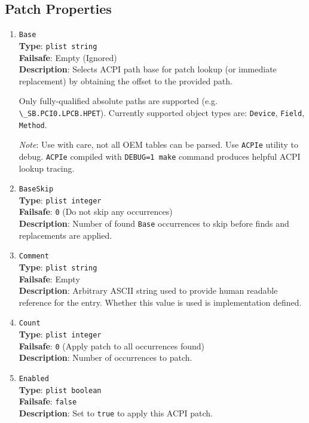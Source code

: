 \documentclass[]{article}
\makeatletter
\renewcommand{\label}[1]{%
\zref@wrapper@immediate{\oldlabel{#1}}}  %
\makeatother
\begin{document}
\subsection{Patch Properties}\label{acpipropspatch}

\begin{enumerate}

\item
  \texttt{Base}\\
  \textbf{Type}: \texttt{plist\ string}\\
  \textbf{Failsafe}: Empty (Ignored)\\
  \textbf{Description}: Selects ACPI path base for patch lookup (or immediate
  replacement) by obtaining the offset to the provided path.

  Only fully-qualified absolute paths are supported (e.g. \texttt{\textbackslash \_SB.PCI0.LPCB.HPET}).
  Currently supported object types are: \texttt{Device}, \texttt{Field}, \texttt{Method}.

  \emph{Note}: Use with care, not all OEM tables can be parsed. Use \texttt{ACPIe}
  utility to debug. \texttt{ACPIe} compiled  with \texttt{DEBUG=1 make} command
  produces helpful ACPI lookup tracing.

\item
  \texttt{BaseSkip}\\
  \textbf{Type}: \texttt{plist\ integer}\\
  \textbf{Failsafe}: \texttt{0} (Do not skip any occurrences)\\
  \textbf{Description}: Number of found \texttt{Base} occurrences to skip before
  finds and replacements are applied.

\item
  \texttt{Comment}\\
  \textbf{Type}: \texttt{plist\ string}\\
  \textbf{Failsafe}: Empty\\
  \textbf{Description}: Arbitrary ASCII string used to provide human readable
  reference for the entry. Whether this value is used is implementation defined.

\item
  \texttt{Count}\\
  \textbf{Type}: \texttt{plist\ integer}\\
  \textbf{Failsafe}: \texttt{0} (Apply patch to all occurrences found)\\
  \textbf{Description}: Number of occurrences to patch.

\item
  \texttt{Enabled}\\
  \textbf{Type}: \texttt{plist\ boolean}\\
  \textbf{Failsafe}: \texttt{false}\\
  \textbf{Description}: Set to \texttt{true} to apply this ACPI patch.


\end{enumerate}
\end{document}
